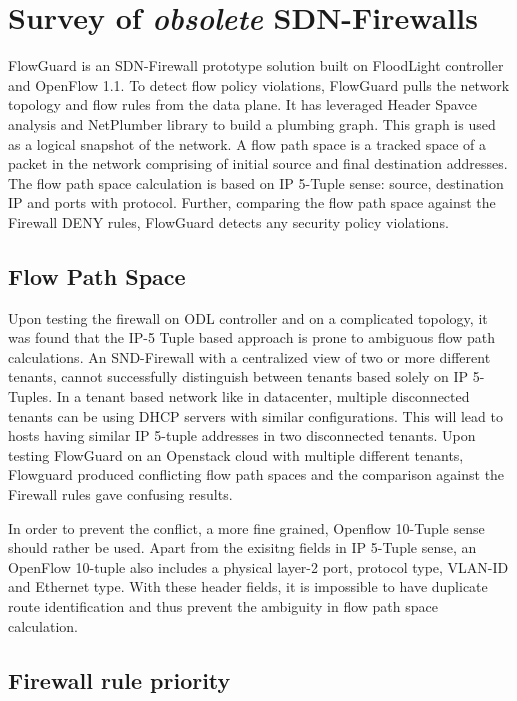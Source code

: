 \section{Survey of {\itshape obsolete} SDN-Firewalls}

FlowGuard is an SDN-Firewall prototype solution built on FloodLight controller and OpenFlow 1.1. To  detect flow policy violations, FlowGuard pulls the network topology and flow rules from the data plane. It has leveraged Header Spavce analysis and NetPlumber library to build a plumbing graph. This graph is used as a logical snapshot of the network. A flow path space is a tracked space of a packet in the network comprising of initial source and final destination addresses. The flow path space calculation is based on IP 5-Tuple sense: source, destination IP and ports with protocol. Further, comparing the flow path space against the Firewall DENY rules, FlowGuard detects any security policy violations.

\subsection{Flow Path Space} Upon testing the firewall on ODL controller and on a complicated topology, it was found that the IP-5 Tuple based approach is prone to ambiguous flow path calculations. An SND-Firewall with a centralized view of two or more different tenants, cannot successfully distinguish between tenants based solely on IP 5-Tuples. In a tenant based network like in datacenter, multiple disconnected tenants can be using DHCP servers with similar configurations. This will lead to hosts having similar IP 5-tuple addresses in two disconnected tenants. Upon testing FlowGuard on an Openstack cloud with multiple different tenants, Flowguard produced conflicting flow path spaces and the comparison against the Firewall rules gave confusing results. 

In order to prevent the conflict, a more fine grained, Openflow 10-Tuple sense should rather be used. Apart from the exisitng fields in IP 5-Tuple sense, an OpenFlow 10-tuple also includes a physical layer-2  port, protocol type, VLAN-ID and Ethernet type. With these header fields, it is impossible to have duplicate route identification and thus prevent the ambiguity in flow path space calculation. 

\subsection{Firewall rule priority}

